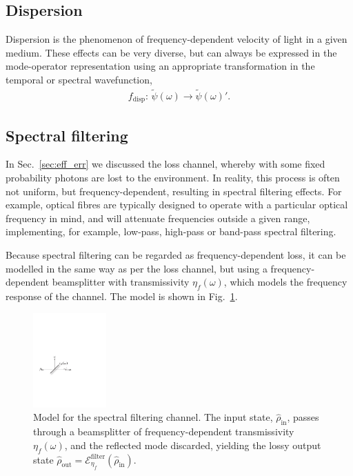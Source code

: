 %
%

\subsection{Dispersion} \label{sec:dispersion}

Dispersion is the phenomenon of frequency-dependent velocity of light in a given medium. These effects can be very diverse, but can always be expressed in the mode-operator representation using an appropriate transformation in the temporal or spectral wavefunction,
\begin{align}
f_\mathrm{disp}: \,\tilde\psi(\omega)\to\tilde\psi(\omega)'.
\end{align}

%
%

\subsection{Spectral filtering} \label{sec:spectral_filt} 

In Sec.~\ref{sec:eff_err} we discussed the loss channel, whereby with some fixed probability photons are lost to the environment. In reality, this process is often not uniform, but frequency-dependent, resulting in spectral filtering effects. For example, optical fibres are typically designed to operate with a particular optical frequency in mind, and will attenuate frequencies outside a given range, implementing, for example, low-pass, high-pass or band-pass spectral filtering.

Because spectral filtering can be regarded as frequency-dependent loss, it can be modelled in the same way as per the loss channel, but using a frequency-dependent beamsplitter with transmissivity $\eta_f(\omega)$, which models the frequency response of the channel. The model is shown in Fig.~\ref{fig:spectral_filter_model}.

\begin{figure}[htpb]
	\includegraphics[width=0.25\textwidth]{spectral_filter_model}
	\caption{Model for the spectral filtering channel. The input state, $\hat\rho_\mathrm{in}$, passes through a beamsplitter of frequency-dependent transmissivity $\eta_f(\omega)$, and the reflected mode discarded, yielding the lossy output state \mbox{$\hat\rho_\mathrm{out} = \mathcal{E}^\mathrm{filter}_{\eta_f}(\hat\rho_\mathrm{in})$}.} \label{fig:spectral_filter_model} 
\end{figure}

